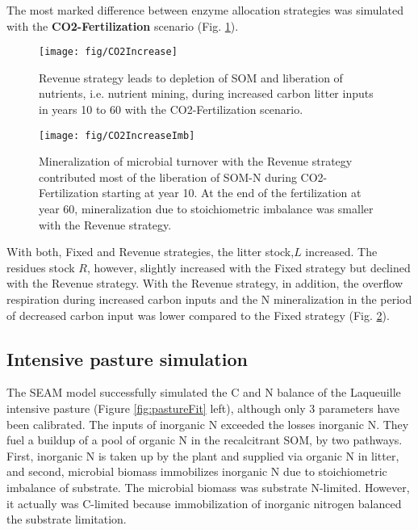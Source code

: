 The most marked difference between enzyme allocation strategies was simulated
with the \textbf{CO2-Fertilization} scenario (Fig. \ref{fig:CO2Increase}).
\begin{figure}[t] \vspace*{2mm}
\begin{center}
\texttt{[image: fig/CO2Increase]}
\end{center}
\caption{
Revenue strategy leads to depletion of SOM and liberation of nutrients, i.e.
nutrient mining, during increased carbon litter inputs
in years 10 to 60 with the CO2-Fertilization scenario.
\label{fig:CO2Increase}}

\end{figure}
\begin{figure}[t] \vspace*{2mm}
\begin{center}
\texttt{[image: fig/CO2IncreaseImb]} 
\end{center}
\caption{
Mineralization of microbial turnover with the Revenue strategy
contributed most of the liberation of SOM-N during CO2-Fertilization starting
at year 10.
At the end of the fertilization at year 60, mineralization due to stoichiometric
imbalance was smaller with the Revenue strategy.
\label{fig:CO2IncreaseImb}}
\end{figure}
With both, Fixed and Revenue strategies, the litter stock,$L$ increased. The
residues stock $R$, however, slightly increased with the Fixed strategy but
declined with the Revenue strategy. With the Revenue strategy, in addition, the
overflow respiration during increased carbon inputs and the N mineralization
in the period of decreased carbon input was lower compared to the Fixed
strategy (Fig. \ref{fig:CO2IncreaseImb}).

\subsection{Intensive pasture simulation
\label{sec:ResultsPasture}}

The SEAM model successfully simulated the C and N balance of the Laqueuille
intensive pasture (Figure \ref{fig:pastureFit} left), although only 3 parameters
have been calibrated.
The inputs of inorganic N exceeded the losses inorganic N. They fuel a buildup
of a pool of organic N in the recalcitrant SOM, by two pathways. First,
inorganic N is taken up by the plant and supplied via organic N in litter, and
second, microbial biomass immobilizes inorganic N due to stoichiometric
imbalance of substrate. The microbial biomass was substrate N-limited. However,
it actually was C-limited because immobilization of inorganic nitrogen balanced
the substrate limitation. 

